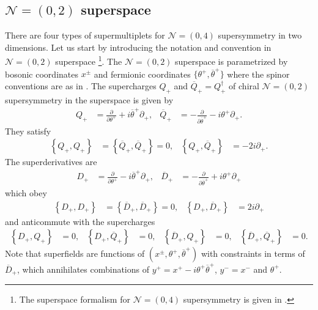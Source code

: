 \documentclass{article}
\numberwithin{equation}{section}
\begin{document}
\subsection{$\mathcal{N}=(0,2)$ superspace}
\label{sec_02sp}
There are four types of supermultiplets for $\mathcal{N}=(0,4)$ supersymmetry in two dimensions. 
Let us start by introducing the notation and convention in $\mathcal{N}=(0,2)$ superspace 
\footnote{
The superspace formalism for $\mathcal{N}=(0,4)$ supersymmetry is given in \cite{Galperin:1994qn, Galperin:1995pq}. 
}. 
The $\mathcal{N}=(0,2)$ superspace is parametrized 
by bosonic coordinates $x^{\pm}$ and fermionic coordinates $\{ \theta^{+}, \overline{\theta}^{+}\}$ 
where the spinor conventions are as in \cite{Wess:1992cp, Witten:1993yc, Adams:2003zy}.  
The supercharges $Q_{+}$ and $\overline{Q}_{+}=Q_{+}^{\dag}$ of chiral $\mathcal{N}=(0,2)$ supersymmetry in the superspace is given by 
\begin{align}
\label{02_sch1}
Q_{+}&=\frac{\partial}{\partial \theta^{+}}+i\overline{\theta}^{+}\partial_{+},& 
\overline{Q}_{+}&=-\frac{\partial}{\partial \overline{\theta}^{+}}-i\theta^{+}\partial_{+}. 
\end{align}
They satisfy 
\begin{align}
\label{02_alg}
\left\{Q_{+}, Q_{+}\right\}&=\left\{\overline{Q}_{+}, \overline{Q}_{+}\right\}=0,& 
\left\{Q_{+},\overline{Q}_{+}\right\}&=-2i\partial_{+}. 
\end{align}
The superderivatives are 
\begin{align}
\label{02_sderiv1}
D_{+}&=\frac{\partial}{\partial \theta^{+}}-i\overline{\theta}^{+}\partial_{+},& 
\overline{D}_{+}&=-\frac{\partial}{\partial \overline{\theta}^{+}}+i\theta^{+}\partial_{+}
\end{align}
which obey 
\begin{align}
\label{02_sderiv2}
\left\{D_{+}, D_{+}\right\}&=\left\{\overline{D}_{+}, \overline{D}_{+}\right\}=0,& 
\left\{D_{+}, \overline{D}_{+}\right\}&=2i\partial_{+}
\end{align}
and anticommute with the supercharges
\begin{align}
\label{02_sderiv3}
\left\{D_{+}, Q_{+}\right\}&=0,& 
\left\{D_{+}, \overline{Q}_{+}\right\}&=0,& 
\left\{\overline{D}_{+}, Q_{+}\right\}&=0,& 
\left\{\overline{D}_{+}, \overline{Q}_{+}\right\}&=0. 
\end{align}
Note that superfields are functions of $(x^{\pm}, \theta^{+}, \overline{\theta}^{+})$ with constraints in terms of $\overline{D}_{+}$, 
which annihilates combinations of $y^{+}=x^{+}-i\theta^{+}\overline{\theta}^{+}$, $y^{-}=x^{-}$ and $\theta^{+}$. 
\end{document}
